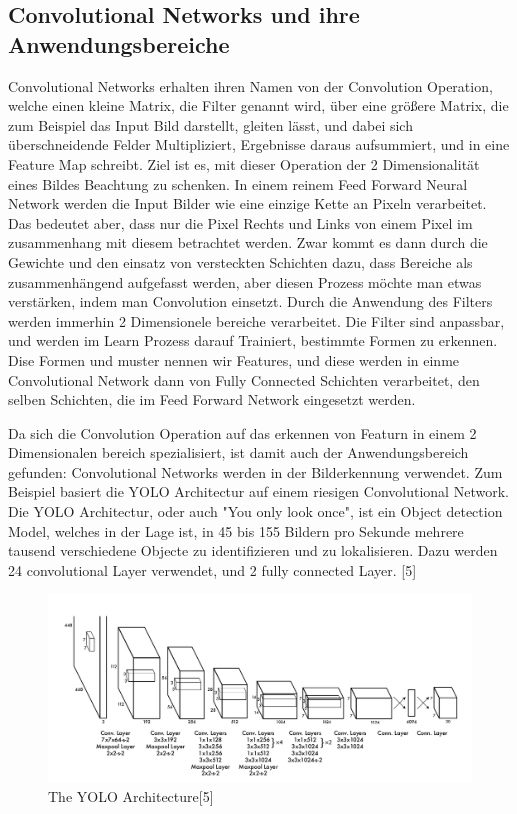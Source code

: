 \documentclass[12pt]{article}
\begin{document}
\subsection{Convolutional Networks und ihre Anwendungsbereiche}
Convolutional Networks erhalten ihren Namen von der Convolution Operation, welche einen kleine Matrix, die Filter genannt wird, über eine größere Matrix, die zum Beispiel das Input Bild darstellt, gleiten lässt, und dabei sich überschneidende Felder Multipliziert, Ergebnisse daraus aufsummiert, und in eine Feature Map schreibt. Ziel ist es, mit dieser Operation der 2 Dimensionalität eines Bildes Beachtung zu schenken. In einem reinem Feed Forward Neural Network werden die Input Bilder wie eine einzige Kette an Pixeln verarbeitet. Das bedeutet aber, dass nur die Pixel Rechts und Links von einem Pixel im zusammenhang mit diesem betrachtet werden. Zwar kommt es dann durch die Gewichte und den einsatz von versteckten Schichten dazu, dass Bereiche als zusammenhängend aufgefasst werden, aber diesen Prozess möchte man etwas verstärken, indem man Convolution einsetzt. Durch die Anwendung des Filters werden immerhin 2 Dimensionele bereiche verarbeitet. Die Filter sind anpassbar, und werden im Learn Prozess darauf Trainiert, bestimmte Formen zu erkennen. Dise Formen und muster nennen wir Features, und diese werden in einme Convolutional Network dann von Fully Connected Schichten verarbeitet, den selben Schichten, die im Feed Forward Network eingesetzt werden. 

Da sich die Convolution Operation auf das erkennen von Featurn in einem 2 Dimensionalen bereich spezialisiert, ist damit auch der Anwendungsbereich gefunden: Convolutional Networks werden in der Bilderkennung verwendet.
Zum Beispiel basiert die YOLO Architectur auf einem riesigen Convolutional Network. Die YOLO Architectur, oder auch "You only look once", ist ein Object detection Model, welches in der Lage ist, in 45 bis 155 Bildern pro Sekunde mehrere tausend verschiedene Objecte zu identifizieren und zu lokalisieren. Dazu werden 24 convolutional Layer verwendet, und 2 fully connected Layer. [5]

\begin{figure}[H]
\centering
\includegraphics[scale=0.38]{Images/BA_007_YOLO.png}
\caption{The YOLO Architecture[5]}
\label{The YOLO Architecture[5]}
\end{figure}
\end{document}
